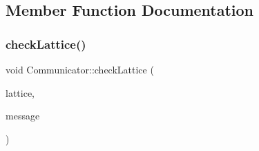 \subsection{Member Function Documentation}
\mbox{\label{class_parallel_1_1_communicator_a9471bf9448f34a0b4575310a3c54af61}} 
\subsubsection{\texorpdfstring{checkLattice()}{checkLattice()}}
{\footnotesize\ttfamily void Communicator\+::check\+Lattice (\begin{DoxyParamCaption}\item[{\mbox{\hyperlink{class_lattice}{Lattice}}$<$ \mbox{\hyperlink{class_s_u3}{S\+U3}} $>$ $\ast$}]{lattice,  }\item[{std\+::string}]{message }\end{DoxyParamCaption})\hspace{0.3cm}{\ttfamily [static]}}

